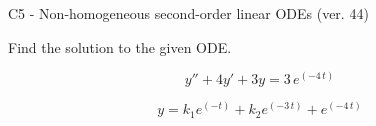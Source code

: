 \begin{exercise}
  \begin{exerciseTitle}C5 - Non-homogeneous second-order linear ODEs (ver. 44)\end{exerciseTitle}
  \begin{exerciseStatement}
    
Find the solution to the given ODE.

    
\[y''+4y'+3y = 3 \, e^{\left(-4 \, t\right)}\]

  \end{exerciseStatement}
  \begin{exerciseAnswer}
    
\[y= k_{1} e^{\left(-t\right)} + k_{2} e^{\left(-3 \, t\right)} + e^{\left(-4 \, t\right)}\]

  \end{exerciseAnswer}
\end{exercise}